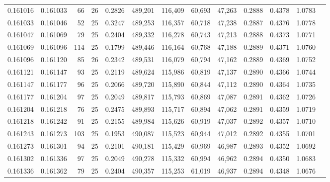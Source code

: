 \begin{tabular}{rrrrrrrrrrrrr}
0.161016 & 0.161033 &    66 &  26 &                                     0.2826 & 489,201 & 116,409 &  60,693 &  47,263 & 0.2888 & 0.4378 & 1.0783 \\
0.161033 & 0.161046 &    52 &  25 &                                     0.3247 & 489,253 & 116,357 &  60,718 &  47,238 & 0.2887 & 0.4376 & 1.0778 \\
0.161047 & 0.161069 &    79 &  25 &                                     0.2404 & 489,332 & 116,278 &  60,743 &  47,213 & 0.2888 & 0.4373 & 1.0771 \\
0.161069 & 0.161096 &   114 &  25 &                                     0.1799 & 489,446 & 116,164 &  60,768 &  47,188 & 0.2889 & 0.4371 & 1.0760 \\
0.161096 & 0.161120 &    85 &  26 &                                     0.2342 & 489,531 & 116,079 &  60,794 &  47,162 & 0.2889 & 0.4369 & 1.0752 \\
0.161121 & 0.161147 &    93 &  25 &                                     0.2119 & 489,624 & 115,986 &  60,819 &  47,137 & 0.2890 & 0.4366 & 1.0744 \\
0.161147 & 0.161177 &    96 &  25 &                                     0.2066 & 489,720 & 115,890 &  60,844 &  47,112 & 0.2890 & 0.4364 & 1.0735 \\
0.161177 & 0.161204 &    97 &  25 &                                     0.2049 & 489,817 & 115,793 &  60,869 &  47,087 & 0.2891 & 0.4362 & 1.0726 \\
0.161204 & 0.161218 &    76 &  25 &                                     0.2475 & 489,893 & 115,717 &  60,894 &  47,062 & 0.2891 & 0.4359 & 1.0719 \\
0.161218 & 0.161242 &    91 &  25 &                                     0.2155 & 489,984 & 115,626 &  60,919 &  47,037 & 0.2892 & 0.4357 & 1.0710 \\
0.161243 & 0.161273 &   103 &  25 &                                     0.1953 & 490,087 & 115,523 &  60,944 &  47,012 & 0.2892 & 0.4355 & 1.0701 \\
0.161273 & 0.161301 &    94 &  25 &                                     0.2101 & 490,181 & 115,429 &  60,969 &  46,987 & 0.2893 & 0.4352 & 1.0692 \\
0.161302 & 0.161336 &    97 &  25 &                                     0.2049 & 490,278 & 115,332 &  60,994 &  46,962 & 0.2894 & 0.4350 & 1.0683 \\
0.161336 & 0.161362 &    79 &  25 &                                     0.2404 & 490,357 & 115,253 &  61,019 &  46,937 & 0.2894 & 0.4348 & 1.0676 \\

\end{tabular}
